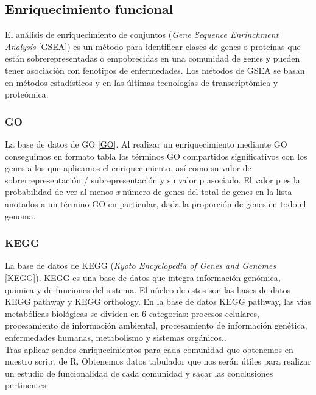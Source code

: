\subsection{Enriquecimiento funcional}

El análisis de enriquecimiento de conjuntos (\textit{Gene Sequence Enrinchment Analysis} \ref{GSEA}) es un método para identificar clases de genes o proteínas que están sobrerepresentadas o empobrecidas en una comunidad de genes y pueden tener asociación con fenotipos de enfermedades. Los métodos de GSEA se basan en métodos estadísticos y en las últimas tecnologías de transcriptómica y proteómica.

\subsubsection{GO}
La base de datos de GO \ref{GO}. Al realizar un enriquecimiento mediante GO conseguimos en formato tabla los términos GO compartidos significativos con los genes a los que aplicamos el enriquecimiento, así como su valor de sobrerrepresentación / subrepresentación y su valor p asociado. El valor p es la probabilidad de ver al menos \textit{x} número de genes del total de genes en la lista anotados a un término GO en particular, dada la proporción de genes en todo el genoma. \\

\subsubsection{KEGG}
La base de datos de KEGG (\textit{Kyoto Encyclopedia of Genes and Genomes} \ref{KEGG}). KEGG es una base de datos que integra información genómica, química y de funciones del sistema. El núcleo de estos son las bases de datos KEGG pathway y KEGG orthology. En la base de datos KEGG pathway, las vías metabólicas biológicas se dividen en 6 categorías: procesos celulares, procesamiento de información ambiental, procesamiento de información genética, enfermedades humanas, metabolismo y sistemas orgánicos.\cite{KEGGBioinformatics}. \\

Tras aplicar sendos enriquecimientos para cada comunidad que obtenemos en nuestro script de R. Obtenemos datos tabulador que nos serán útiles para realizar un estudio de funcionalidad de cada comunidad y sacar las conclusiones pertinentes.